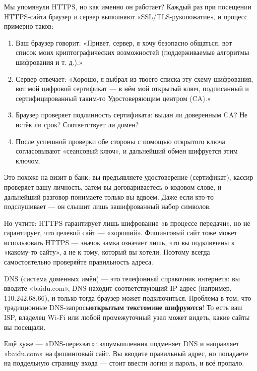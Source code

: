 
Мы упомянули HTTPS, но как именно он работает? Каждый раз при посещении HTTPS-сайта браузер и сервер выполняют «SSL/TLS-рукопожатие», и процесс примерно таков:

\begin{enumerate}
  \item Ваш браузер говорит: «Привет, сервер, я хочу безопасно общаться, вот список моих криптографических возможностей (поддерживаемые алгоритмы шифрования и т. д.).»
  \item Сервер отвечает: «Хорошо, я выбрал из твоего списка эту схему шифрования, вот мой цифровой сертификат — в нём мой открытый ключ, подписанный и сертифицированный таким-то Удостоверяющим центром (CA).»
  \item Браузер проверяет подлинность сертификата: выдан ли доверенным CA? Не истёк ли срок? Соответствует ли домен?
  \item После успешной проверки обе стороны с помощью открытого ключа согласовывают «сеансовый ключ», и дальнейший обмен шифруется этим ключом.
\end{enumerate}

Это похоже на визит в банк: вы предъявляете удостоверение (сертификат), кассир проверяет вашу личность, затем вы договариваетесь о кодовом слове, и дальнейший разговор понимаете только вы вдвоём. Даже если кто-то подслушивает — он слышит лишь зашифрованный набор символов.

Но учтите: HTTPS гарантирует лишь шифрование «в процессе передачи», но не гарантирует, что целевой сайт — «хороший». Фишинговый сайт тоже может использовать HTTPS — значок замка означает лишь, что вы подключены к «какому-то сайту», а не к тому, который вы хотели. Поэтому всегда самостоятельно проверяйте правильность адреса.


DNS (система доменных имён) — это телефонный справочник интернета: вы вводите «baidu.com», DNS находит соответствующий IP-адрес (например, 110.242.68.66), и только тогда браузер может подключиться. Проблема в том, что традиционные DNS-запросы\textbf{открытым текстом}и\textbf{не шифруются}! То есть ваш ISP, владелец Wi-Fi или любой промежуточный узел может видеть, какие сайты вы посещали.

Ещё хуже — «DNS-перехват»: злоумышленник подменяет DNS и направляет «baidu.com» на фишинговый сайт. Вы вводите правильный адрес, но попадаете на поддельную страницу входа — стоит ввести логин и пароль, и всё пропало.

